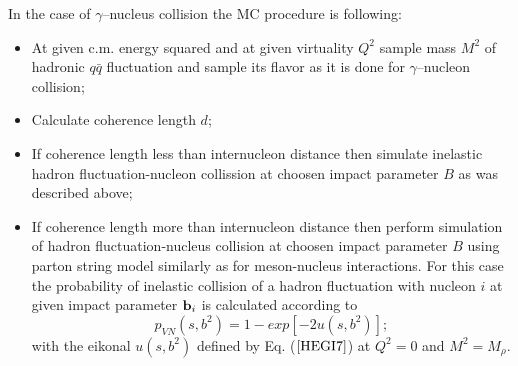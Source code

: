 In the case of $\gamma$--nucleus collision the MC procedure is following:
\begin{itemize}
\item At given c.m. energy squared and at given virtuality
 $Q^2$ sample mass $M^2$ of 
hadronic $q\bar{q}$ fluctuation and sample its flavor as it is done for 
$\gamma$--nucleon collision;

\item Calculate coherence length $d$;

\item If coherence length less than internucleon distance 
then simulate inelastic 
hadron fluctuation-nucleon collission at choosen impact 
parameter $B$ as was described 
above;

\item If coherence length more than internucleon distance then 
 perform simulation of hadron fluctuation-nucleus collision at choosen 
impact parameter $B$ using parton string model similarly as for meson-nucleus 
interactions. For this case the probability of inelastic collision of
a  hadron fluctuation with nucleon
$i$  at given impact parameter ${\bf b}_i$ is calculated according to
\begin{equation}
\label{GIMA3} p_{VN}(s,b^2) = 1 - exp{[-2u(s, b^2)]};
\end{equation}
with  the eikonal $u(s,b^2)$ defined by Eq. ($\ref{HEGI7}$) at 
$Q^2 = 0$ and $M^2=M_{\rho}$.
\end{itemize}



